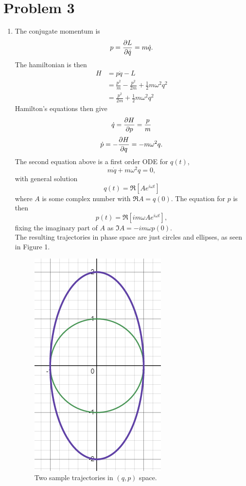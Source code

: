 \documentclass[12pt]{article}
\begin{document}
\section*{Problem 3}
\begin{enumerate}[label=\roman*.]
    \item The conjugate momentum is
    \[ p = \pdv{L}{\dot{q}} = m\dot{q}. \]
    The hamiltonian is then
    \begin{align*}
        H &= p\dot{q} - L \\
        &= \frac{p^2}{m} - \frac{p^2}{2m} + \frac{1}{2}m\omega^2q^2 \\
        &= \boxed{\frac{p^2}{2m} + \frac{1}{2}m\omega^2q^2}
    \end{align*}
    Hamilton's equations then give
    \[ \dot{q} = \pdv{H}{p} = \frac{p}{m} \]
    \[ \dot{p} = -\pdv{H}{q} = -m\omega^2q. \]
    The second equation above is a first order ODE for $q(t)$,
    \[ m\dot{q} + m\omega^2q = 0, \]
    with general solution
    \[ \boxed{q(t) = \Re[Ae^{i\omega t}]} \]
    where $A$ is some complex number with $\Re A = q(0)$. The equation for $p$ is then
    \[ \boxed{p(t) = \Re[im\omega Ae^{i\omega t}]}, \]
    fixing the imaginary part of $A$ as $\Im A = -im\omega p(0)$. \\
    The resulting trajectories in phase space are just circles and ellipses, as seen in Figure 1.
    \begin{figure}[H]
        \includegraphics[scale=0.75]{fig1}
        \centering
        \caption{Two sample trajectories in $(q,p)$ space.}
        \label{fig1}
    \end{figure}


\end{enumerate}
\end{document}
